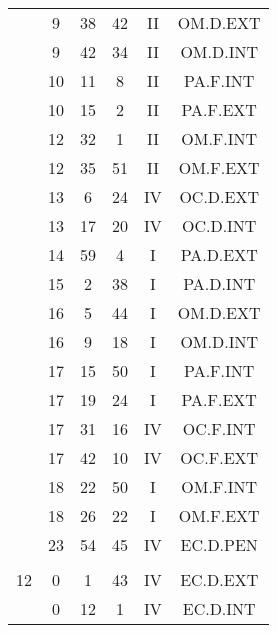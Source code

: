 \documentclass[12pt, a4paper]{article}
\begin{document}
\begin{multicols}{3}
{\begin{tabular}{c c c c c c}
	 	 	 	 & 9 & 38 & 42 & II & OM.D.EXT\\%
	 	 	 	 & 9 & 42 & 34 & II & OM.D.INT\\%
	 	 	 	 & 10 & 11 & 8 & II & PA.F.INT\\%
	 	 	 	 & 10 & 15 & 2 & II & PA.F.EXT\\%
	 	 	 	 & 12 & 32 & 1 & II & OM.F.INT\\%
	 	 	 	 & 12 & 35 & 51 & II & OM.F.EXT\\%
	 	 	 	 & 13 & 6 & 24 & IV & OC.D.EXT\\%
	 	 	 	 & 13 & 17 & 20 & IV & OC.D.INT\\%
	 	 	 	 & 14 & 59 & 4 & I & PA.D.EXT\\%
	 	 	 	 & 15 & 2 & 38 & I & PA.D.INT\\%
	 	 	 	 & 16 & 5 & 44 & I & OM.D.EXT\\%
	 	 	 	 & 16 & 9 & 18 & I & OM.D.INT\\%
	 	 	 	 & 17 & 15 & 50 & I & PA.F.INT\\%
	 	 	 	 & 17 & 19 & 24 & I & PA.F.EXT\\%
	 	 	 	 & 17 & 31 & 16 & IV & OC.F.INT\\%
	 	 	 	 & 17 & 42 & 10 & IV & OC.F.EXT\\%
	 	 	 	 & 18 & 22 & 50 & I & OM.F.INT\\%
	 	 	 	 & 18 & 26 & 22 & I & OM.F.EXT\\%
	 	 	 	 & 23 & 54 & 45 & IV & EC.D.PEN\\%
	 	 	 	 & & & & & \\%
	 	 	 	12 & 0 & 1 & 43 & IV & EC.D.EXT\\%
	 	 	 	 & 0 & 12 & 1 & IV & EC.D.INT\\%
	 	 \end{tabular}
 	}
\end{multicols}
\end{document}
